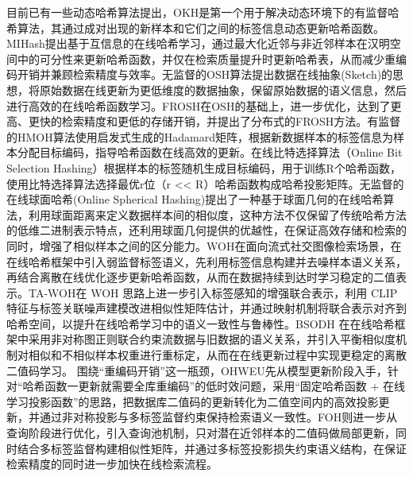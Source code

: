 目前已有一些动态哈希算法提出，OKH是第一个用于解决动态环境下的有监督哈希算法，其通过成对出现的新样本和它们之间的标签信息动态更新哈希函数。MIHash提出基于互信息的在线哈希学习，通过最大化近邻与非近邻样本在汉明空间中的可分性来更新哈希函数，并仅在检索质量提升时更新哈希表，从而减少重编码开销并兼顾检索精度与效率。无监督的OSH算法提出数据在线抽象(Sketch)的思想，将原始数据在线更新为更低维度的数据抽象，保留原始数据的语义信息，然后进行高效的在线哈希函数学习。FROSH在OSH的基础上，进一步优化，达到了更高、更快的检索精度和更低的存储开销，并提出了分布式的FROSH方法。有监督的HMOH算法使用启发式生成的Hadamard矩阵，根据新数据样本的标签信息为样本分配目标编码，指导哈希函数在线高效的更新。在线比特选择算法（Online Bit Selection Hashing）根据样本的标签随机生成目标编码，用于训练R个哈希函数，使用比特选择算法选择最优r位（r << R）哈希函数构成哈希投影矩阵。无监督的在线球面哈希(Online Spherical Hashing)提出了一种基于球面几何的在线哈希算法，利用球面距离来定义数据样本间的相似度，这种方法不仅保留了传统哈希方法的低维二进制表示特点，还利用球面几何提供的优越性，在保证高效存储和检索的同时，增强了相似样本之间的区分能力。WOH在面向流式社交图像检索场景，在在线哈希框架中引入弱监督标签语义，先利用标签信息构建并去噪样本语义关系，再结合离散在线优化逐步更新哈希函数，从而在数据持续到达时学习稳定的二值表示。TA-WOH在 WOH 思路上进一步引入标签感知的增强联合表示，利用 CLIP 特征与标签关联噪声建模改进相似性矩阵估计，并通过映射机制将联合表示对齐到哈希空间，以提升在线哈希学习中的语义一致性与鲁棒性。BSODH 在在线哈希框架中采用非对称图正则联合约束流数据与旧数据的语义关系，并引入平衡相似度机制对相似和不相似样本权重进行重标定，从而在在线更新过程中实现更稳定的离散二值码学习。
围绕“重编码开销”这一瓶颈，OHWEU先从模型更新阶段入手，针对“哈希函数一更新就需要全库重编码”的低时效问题，采用“固定哈希函数 + 在线学习投影函数”的思路，把数据库二值码的更新转化为二值空间内的高效投影更新，并通过非对称投影与多标签监督约束保持检索语义一致性。FOH则进一步从查询阶段进行优化，引入查询池机制，只对潜在近邻样本的二值码做局部更新，同时结合多标签监督构建相似性矩阵，并通过多标签投影损失约束语义结构，在保证检索精度的同时进一步加快在线检索流程。

